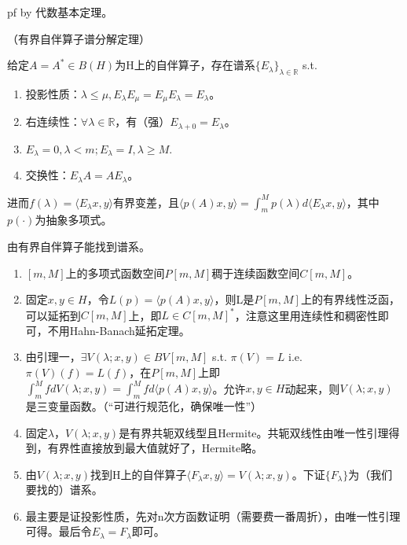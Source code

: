 pf by 代数基本定理。

\begin{thm}（有界自伴算子谱分解定理）

  给定$A = A^{\ast} \in B(H)$为H上的自伴算子，存在谱系$\{E_\lambda\}_{\lambda \in \mathbb{R}}$ s.t.
  \begin{enumerate}
    \item 投影性质：$\lambda \le \mu, E_\lambda E_\mu = E_\mu E_\lambda = E_\lambda$。
    \item 右连续性：$\forall \lambda \in \mathbb{R}$，有（强）$E_{\lambda + 0} = E_\lambda$。
    \item $E_\lambda = 0, \lambda < m; E_\lambda = I, \lambda \ge M$.
    \item 交换性：$E_\lambda A = A E_\lambda$。
  \end{enumerate}
  进而$f(\lambda) = \langle E_\lambda x, y \rangle$有界变差，且$\langle p(A) x, y \rangle = \int_m^M p(\lambda) d\langle E_\lambda x, y \rangle$，其中$p(\cdot)$为抽象多项式。
\end{thm}

由有界自伴算子能找到谱系。

\begin{pf}
  \quad
  \begin{enumerate}
    \item $[m, M]$上的多项式函数空间$P[m, M]$稠于连续函数空间$C[m, M]$。
    \item 固定$x, y \in H$，令$L(p) = \langle p(A)x, y \rangle$，则L是$P[m, M]$上的有界线性泛函，可以延拓到$C[m, M]$上，即$L \in C[m, M]^{\ast}$，注意这里用连续性和稠密性即可，不用Hahn-Banach延拓定理。
    \item 由引理一，$\exists V(\lambda;x, y) \in BV[m, M]$ s.t. $\pi(V) = L$ i.e. $\pi(V)(f) = L(f)$，在$P[m, M]$上即$\int_m^M f dV(\lambda;x, y) = \int_m^M f d\langle p(A)x, y \rangle$。允许$x, y \in H$动起来，则$V(\lambda;x, y)$是三变量函数。（“可进行规范化，确保唯一性”）
    \item 固定$\lambda$，$V(\lambda;x, y)$是有界共轭双线型且Hermite。共轭双线性由唯一性引理得到，有界性直接放到最大值就好了，Hermite略。
    \item 由$V(\lambda;x, y)$找到H上的自伴算子$\langle F_\lambda x, y \rangle = V(\lambda;x, y)$。下证$\{F_\lambda\}$为（我们要找的）谱系。
    \item 最主要是证投影性质，先对n次方函数证明（需要费一番周折），由唯一性引理可得。最后令$E_\lambda = F_\lambda$即可。
  \end{enumerate}
\end{pf}

